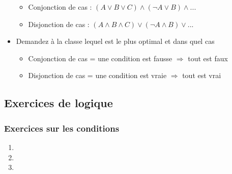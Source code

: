 \documentclass[11pt,a4paper]{article}
\begin{document}
\begin{itemize}
\begin{itemize}[label=$\bullet$]
  \item Conjonction de cas : $ ( A \vee B \vee C) \wedge ( \neg A \vee B ) \wedge ... $
  \item Disjonction de cas : $ ( A \wedge B \wedge C) \vee ( \neg A \wedge B ) \vee ... $
  \end{itemize}
\item Demandez à la classe lequel est le plus optimal et dans quel cas
  \begin{itemize}[label=$\bullet$]
  \item Conjonction de cas = une condition est fausse $ \Rightarrow $ tout est faux
  \item Disjonction de cas = une condition est vraie $ \Rightarrow $ tout est vrai
  \end{itemize}
\end{itemize}

\bigskip



\subsection{Exercices de logique}

\subsubsection{Exercices sur les conditions}


\medskip


\begin{enumerate}[label=\alph*]
\item {}
\item {}
\item {}
\end{enumerate}
\end{document}
